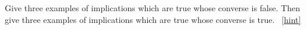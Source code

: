\documentclass{book}
\begin{document}
\setcounter{project}{13}
\addtocounter{project}{-1}
\begin{activity}[]\label{activity-8}
\hypertarget{p-168}{}%
Give three examples of implications which are true whose converse is false.  Then give three examples of implications which are true whose converse is true.%
~\hfill{\tiny\hyperlink{a-13}{[hint]}\hypertarget{q-13}{}}\end{activity}
\end{document}
